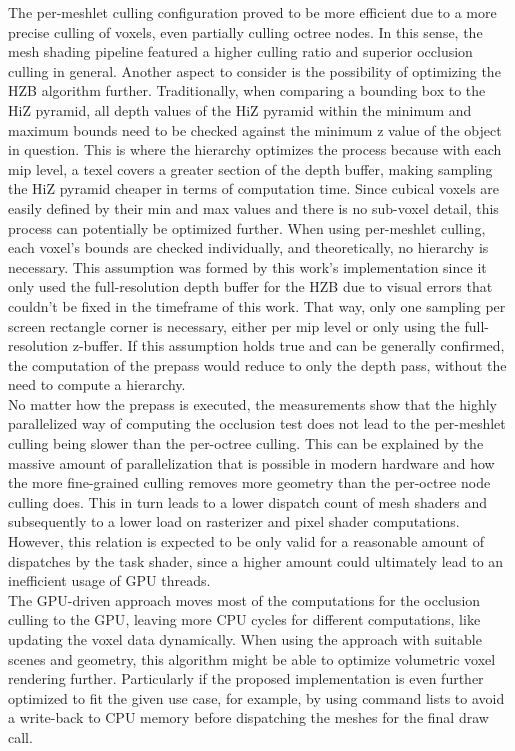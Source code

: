 \noindent
The per-meshlet culling configuration proved to be more efficient due to a more precise culling of voxels, even partially 
culling octree nodes. In this sense, the mesh shading pipeline featured a higher culling ratio and superior occlusion 
culling in general. Another aspect to consider is the possibility of optimizing the \ac{HZB} algorithm further. 
Traditionally, when comparing a bounding box to the \ac{HiZ} pyramid, all depth values of the \ac{HiZ} pyramid within the 
minimum and maximum bounds need to be checked against the minimum z value of the object in question. This is where the 
hierarchy optimizes the process because with each mip level, a texel covers a greater section of the depth buffer, making 
sampling the \ac{HiZ} pyramid cheaper in terms of computation time. Since cubical voxels are easily defined by their min 
and max values and there is no sub-voxel detail, this process can potentially be optimized further. When using per-meshlet 
culling, each voxel's bounds are checked individually, and theoretically, no hierarchy is necessary. This assumption was 
formed by this work's implementation since it only used the full-resolution depth buffer for the \ac{HZB} due to visual 
errors that couldn't be fixed in the timeframe of this work. That way, only one sampling per screen rectangle corner is 
necessary, either per mip level or only using the full-resolution z-buffer. If this assumption holds true and can be 
generally confirmed, the computation of the prepass would reduce to only the depth pass, without the need to compute a 
hierarchy. \\

\noindent
No matter how the prepass is executed, the measurements show that the highly parallelized way of computing the occlusion 
test does not lead to the per-meshlet culling being slower than the per-octree culling. This can be explained by the 
massive amount of parallelization that is possible in modern hardware and how the more fine-grained culling removes more 
geometry than the per-octree node culling does. This in turn leads to a lower dispatch count of mesh shaders and 
subsequently to a lower load on rasterizer and pixel shader computations. However, this relation is expected to be only 
valid for a reasonable amount of dispatches by the task shader, since a higher amount could ultimately lead to an 
inefficient usage of \ac{GPU} threads. \\

\noindent
The \ac{GPU}-driven approach moves most of the computations for the occlusion culling to the \ac{GPU}, leaving more 
\ac{CPU} cycles for different computations, like updating the voxel data dynamically. When using the approach with 
suitable scenes and geometry, this algorithm might be able to optimize volumetric voxel rendering further. Particularly 
if the proposed implementation is even further optimized to fit the given use case, for example, by using command lists 
to avoid a write-back to \ac{CPU} memory before dispatching the meshes for the final draw call. \\

